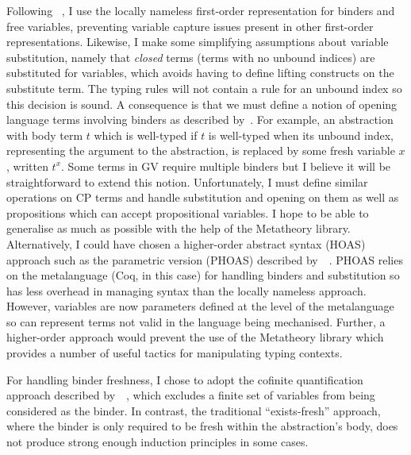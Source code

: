 \documentclass{mprop}
\begin{document}
Following \citeauthor{Aydemir:2008:EFM}~\cite{Aydemir:2008:EFM}, I use the locally nameless first-order representation for binders and free variables, preventing variable capture issues present in other first-order representations. Likewise, I make some simplifying assumptions about variable substitution, namely that \textit{closed} terms (terms with no unbound indices) are substituted for variables, which avoids having to define lifting constructs on the substitute term. The typing rules will not contain a rule for an unbound index so this decision is sound. A consequence is that we must define a notion of opening language terms involving binders as described by~\citeauthor{Aydemir:2008:EFM}. For example, an abstraction with body term $t$ which is well-typed if $t$ is well-typed when its unbound index, representing the argument to the abstraction, is replaced by some fresh variable $x$, written $t^x$. Some terms in GV require multiple binders but I believe it will be straightforward to extend this notion. Unfortunately, I must define similar operations on CP terms and handle substitution and opening on them as well as propositions which can accept propositional variables. I hope to be able to generalise as much as possible with the help of the Metatheory library. Alternatively, I could have chosen a higher-order abstract syntax (HOAS) approach such as the parametric version (PHOAS) described by~\citeauthor{Chlipala:2008:PHOAS}~\cite{Chlipala:2008:PHOAS}. PHOAS relies on the metalanguage (Coq, in this case) for handling binders and substitution so has less overhead in managing syntax than the locally nameless approach. However, variables are now parameters defined at the level of the metalanguage so can represent terms not valid in the language being mechanised. Further, a higher-order approach would prevent the use of the Metatheory library which provides a number of useful tactics for manipulating typing contexts.

For handling binder freshness, I chose to adopt the cofinite quantification approach described by~\cite{Aydemir:2008:EFM}~\cite{Aydemir:2008:EFM}, which excludes a finite set of variables from being considered as the binder. In contrast, the traditional ``exists-fresh'' approach, where the binder is only required to be fresh within the abstraction's body, does not produce strong enough induction principles in some cases.
\end{document}
